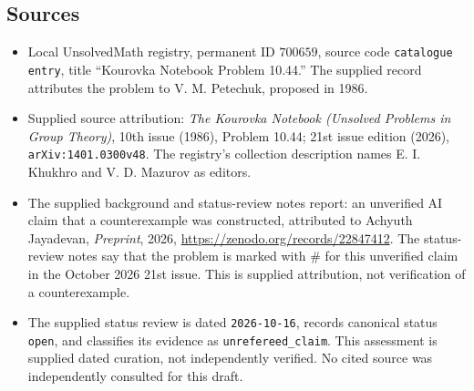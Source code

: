 \documentclass[11pt]{article}
\begin{document}
\subsection{Sources}
\begin{itemize}
\item Local UnsolvedMath registry, permanent ID \(700659\), source code \texttt{catalogue entry}, title ``Kourovka Notebook Problem 10.44.'' The supplied record attributes the problem to V. M. Petechuk, proposed in 1986.
\item Supplied source attribution: \emph{The Kourovka Notebook (Unsolved Problems in Group Theory)}, 10th issue (1986), Problem 10.44; 21st issue edition (2026), \texttt{arXiv:1401.0300v48}. The registry's collection description names E. I. Khukhro and V. D. Mazurov as editors.
\item The supplied background and status-review notes report: an unverified AI claim that a counterexample was constructed, attributed to Achyuth Jayadevan, \emph{Preprint}, 2026, \url{https://zenodo.org/records/22847412}. The status-review notes say that the problem is marked with \(\#\) for this unverified claim in the October 2026 21st issue. This is supplied attribution, not verification of a counterexample.
\item The supplied status review is dated \texttt{2026-10-16}, records canonical status \texttt{open}, and classifies its evidence as \texttt{unrefereed\_claim}. This assessment is supplied dated curation, not independently verified. No cited source was independently consulted for this draft.
\end{itemize}
\end{document}
